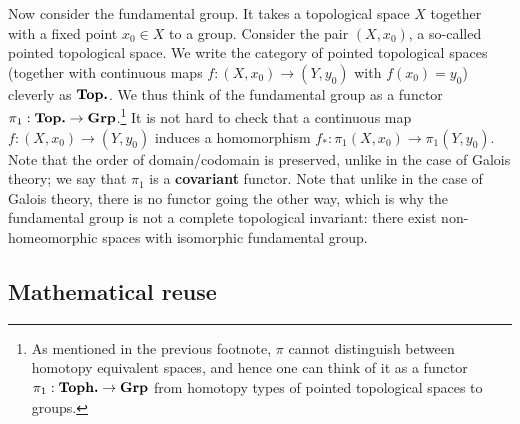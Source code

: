\documentclass{../../mathnotes}
\begin{document}
Now consider the fundamental group. It takes a topological space $X$ together with a fixed point $x_0\in X$ to
a group. Consider the pair $(X,x_0)$, a so-called pointed topological space. We write the category of pointed topological
spaces (together with continuous maps $f:(X,x_0)\to(Y,y_0)$ with $f(x_0)=y_0$) cleverly as ${ \normalfont\textbf{Top.}}$. We thus
think of the fundamental group as a functor $\pi_1:{ \normalfont\textbf{Top.}}\to { \normalfont\textbf{Grp}}$.\footnote{As mentioned in the previous
    footnote, $\pi$ cannot distinguish between homotopy equivalent spaces, and hence
    one can think of it as a functor $\pi_1:{ \normalfont\textbf{Toph.}}\to{ \normalfont\textbf{Grp}}$ from homotopy types of pointed topological spaces
    to groups.}
It is not hard to check that
a continuous map $f:(X,x_0)\to (Y,y_0)$ induces a homomorphism $f_*:\pi_1(X,x_0)\to \pi_1(Y,y_0)$. Note that the order
of domain/codomain is preserved, unlike in the case of Galois theory; we say that $\pi_1$ is a \textbf{covariant} functor.
Note that unlike in the case of Galois theory, there is no functor going the other way, which is why the fundamental group
is not a complete topological invariant: there exist non-homeomorphic spaces with isomorphic fundamental group.

\subsection*{Mathematical reuse}
\end{document}
